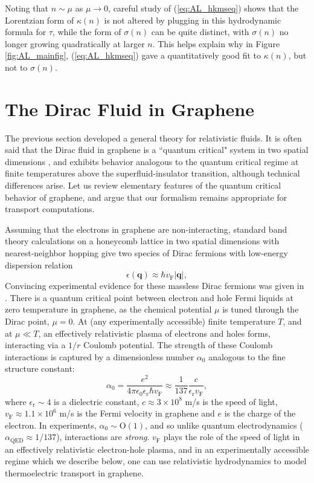 Noting that $n\sim \mu$ as $\mu\rightarrow 0$,  careful study of (\ref{eq:AL_hkmseq}) shows that the Lorentzian form of $\kappa(n)$ is not altered by plugging in this hydrodynamic formula for $\tau$,   while the form of $\sigma(n)$ can be quite distinct,  with $\sigma(n)$ no longer growing quadratically at larger $n$.   This helps explain why in Figure \ref{fig:AL_mainfig}, (\ref{eq:AL_hkmseq}) gave a quantitatively good fit to $\kappa(n)$, but not to $\sigma(n)$. 
 
 \section{The Dirac Fluid in Graphene}\label{section:AL_secgraphene}
 The previous section developed a general theory for relativistic fluids.    It is often said that the Dirac fluid in graphene is a ``quantum critical" system in two spatial dimensions \cite{vafek_anomalous_2007, sheehy_quantum_2007, muller_graphene:_2009}, and exhibits behavior analogous to the quantum critical regime at finite temperatures above the superfluid-insulator transition, although technical differences arise.  Let us review elementary features of the quantum critical behavior of graphene, and argue that our formalism remains appropriate for transport computations.

Assuming that the electrons in graphene are non-interacting, standard band theory calculations on a honeycomb lattice in two spatial dimensions with nearest-neighbor hopping give two species of Dirac fermions with low-energy dispersion relation
\begin{equation}
\epsilon(\mathbf{q}) \approx \hbar v_{\mathrm{F}} |\mathbf{q}|,  \label{eq:AL_eq1}
\end{equation}
Convincing experimental evidence for these massless Dirac fermions was given in \cite{geim2005, kim2005}.  There is a quantum critical point between electron and hole Fermi liquids at zero temperature in graphene, as the chemical potential $\mu$ is tuned through the Dirac point,  $\mu=0$.   At (any experimentally accessible) finite temperature $T$, and at $\mu \ll T$, an effectively relativistic plasma of electrons and holes forms, interacting via a $1/r$ Coulomb potential.    The strength of these Coulomb interactions is captured by a dimensionless number $\alpha_0$ analogous to the fine structure constant: \begin{equation}
\alpha_0 = \frac{e^2}{4\pi \epsilon_0 \epsilon_{\mathrm{r}} \hbar v_{\mathrm{F}}} \approx \frac{1}{137} \frac{c}{\epsilon_{\mathrm{r}} v_{\mathrm{F}}},
\end{equation}
where $\epsilon_{\mathrm{r}} \sim 4$ is a dielectric constant,  $c \approx 3\times 10^8$ m/s is the speed of light,  $v_{\mathrm{F}} \approx 1.1 \times 10^6$ m/s is the Fermi velocity in graphene and $e$ is the charge of the electron.    In experiments, $\alpha_0 \sim \mathrm{O}(1)$, and so unlike quantum electrodynamics ($\alpha_{\mathrm{QED}} \approx 1/137$),  interactions are \emph{strong}.  $v_{\mathrm{F}}$ plays the role of the speed of light in an effectively relativistic electron-hole plasma, and in an experimentally accessible regime which we describe below,  one can use relativistic hydrodynamics to model thermoelectric transport in graphene.   

